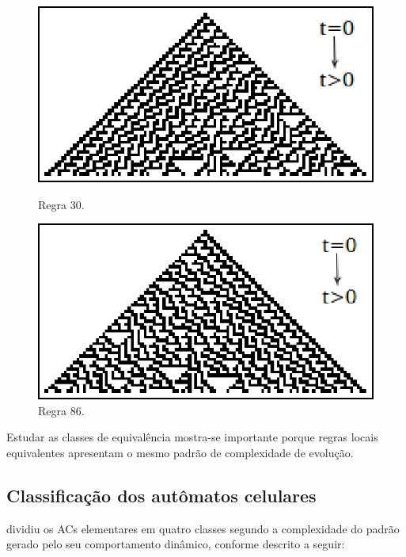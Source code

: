 \documentclass[12pt,a4paper]{article}
\begin{document}
\begin{figure}[ht]
\begin{minipage}[b]{0.5\linewidth}
\centering
\includegraphics[scale=0.85]{img/rule30.eps}
\caption{Regra 30.}
\label{fig:rule30}
\end{minipage}
\hspace{0.5cm}
\begin{minipage}[b]{0.5\linewidth}
\centering
\includegraphics[scale=0.85]{img/rule86.eps}
\caption{Regra 86.}
\label{fig:rule86}
\end{minipage}
\end{figure}

Estudar as classes de equivalência mostra-se importante porque regras locais
equivalentes apresentam o mesmo padrão de complexidade de evolução.

\subsection{Classificação dos autômatos celulares}

 dividiu os ACs elementares em quatro
classes segundo a complexidade do padrão gerado pelo seu comportamento dinâmico,
conforme descrito a seguir:
\end{document}
